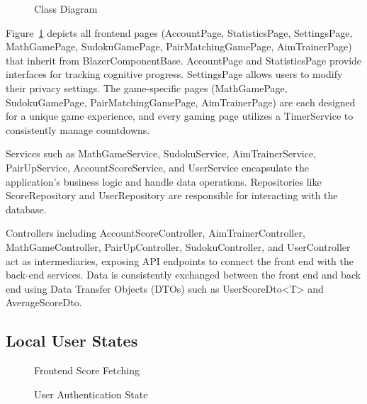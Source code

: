 \documentclass[11pt,a4paper]{article}
\newcommand{\inputdiagram}[1]{}
\newcommand{\textwidthdiagram}[2][1]{%
  \resizebox{#1\textwidth}{!}{\inputdiagram{#2}}%
}
\begin{document}
\begin{figure}[H]
    \centering
    \begin{adjustbox}{width=0.98\paperwidth,center}
        \inputdiagram{class_diagram.latex}
    \end{adjustbox}
    \caption{Class Diagram}
    \label{fig:class_diagram}
\end{figure}

Figure~\ref{fig:class_diagram} depicts all frontend pages (AccountPage, StatisticsPage, SettingsPage, MathGamePage, SudokuGamePage, PairMatchingGamePage, AimTrainerPage) that inherit from BlazerComponentBase. AccountPage and StatisticsPage provide interfaces for tracking cognitive progress. SettingsPage allows users to modify their privacy settings. The game-specific pages (MathGamePage, SudokuGamePage, PairMatchingGamePage, AimTrainerPage) are each designed for a unique game experience, and every gaming page utilizes a TimerService to consistently manage countdowns.

Services such as MathGameService, SudokuService, AimTrainerService, PairUpService, AccountScoreService, and UserService encapsulate the application's business logic and handle data operations. Repositories like ScoreRepository and UserRepository are responsible for interacting with the database.

Controllers including AccountScoreController, AimTrainerController, MathGameController, PairUpController, SudokuController, and UserController act as intermediaries, exposing API endpoints to connect the front end with the back-end services. Data is consistently exchanged between the front end and back end using Data Transfer Objects (DTOs) such as UserScoreDto<T> and AverageScoreDto. 

\subsection{Local User States}
\begin{figure}[H]
    \centering
    \begin{minipage}[b]{0.59\textwidth}
        \centering
        \textwidthdiagram{score_fetching_state.tex}
        \caption{Frontend Score Fetching}
        \label{fig:score_fetching_state}
    \end{minipage}
    \hfil
    \begin{minipage}[b]{0.4\textwidth}
        \centering
        \textwidthdiagram{user_authentication_state.tex}
        \caption{User Authentication State}
        \label{fig:user_authentication_state}
    \end{minipage}
\end{figure}
\end{document}
